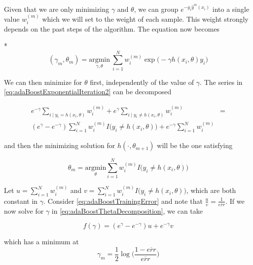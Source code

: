 Given that we are only minimizing $\gamma$ and $\theta$, we can group $e^{-y_i \hat{y}^{m}(x_i)}$ into a single value $w_i^{(m)}$ which we will set to the weight of each sample.
This weight strongly depends on the past steps of the algorithm.
The equation now becomes

*
\begin{equation}\label{eq:adaBoostExponentialIteration2}
(\gamma_{m}, \theta_{m}) = \underset{\gamma, \theta}{\mathrm{argmin}} \  \sum_{i=1}^{N} w_i^{(m)} \exp \big(-\gamma h(x_i,\theta)y_i \big)
\end{equation}

We can then minimize for $\theta$ first, independently of the value of $\gamma$.
The series in \cref{eq:adaBoostExponentialIteration2} can be decomposed

\begin{equation}\label{eq:adaBoostThetaDecomposition}
\begin{split}
e^{-\gamma} \sum_{i \mid y_i = h(x_i,\theta)} w_i^{(m)} + e^{\gamma} \sum_{i \mid y_i \neq h(x_i,\theta)} w_i^{(m)} & = \\
( e^{\gamma} - e^{-\gamma}) \sum_{i = 1}^{N} w_i^{(m)} I \big( y_i \neq h(x_i,\theta)  \big) + e^{-\gamma} \sum_{i = 1}^{N}  w_i^{(m)} &
\end{split}
\end{equation}


and then the minimizing solution for $h(\cdot, \theta_{m+1})$ will be the one satisfying

\begin{equation}\label{eq:adaBoostThetaMinimization}
\theta_{m} = \underset{ \theta}{\mathrm{argmin}} \sum_{i=1}^{N} w_i^{(m)} I \big( y_i \neq h(x_i,\theta)  \big)
\end{equation}

Let $u = \sum_{i=1}^{N} w_i^{(m)}$ and $v = \sum_{i=1}^{N} w_i^{(m)} I \big( y_i \neq h(x_i,\theta)  \big) $, which are both constant in $\gamma$.
Consider \cref{eq:adaBoostTrainingError} and note that $\frac{u}{v} = \frac{1}{\overline{err}}$.
If we now solve for $\gamma$ in \cref{eq:adaBoostThetaDecomposition}, we can take

\begin{equation}\label{eq:adaBoostBetaMinimization}
f(\gamma) = ( e^{\gamma} - e^{-\gamma}) u + e^{-\gamma}v
\end{equation}

which has a minimum at
\begin{equation}
\gamma_{m} = \frac{1}{2} \log\big( \frac{1 - \overline{err} }{ \overline{err} } \big)
\end{equation}

